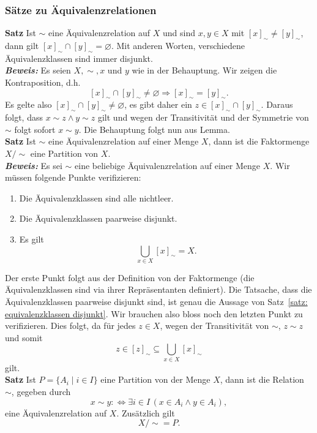 \subsubsection{Sätze zu Äquivalenzrelationen}%
\label{ssub:sätze_zu_äquivalenzrelationen}
\textbf{Satz }
  Ist $\sim $ eine Äquivalenzrelation auf $X$ und sind $x,y\in X$ mit $[x]_\sim\neq[y]_\sim$, dann gilt $[x]_\sim\cap[y]_\sim=\varnothing$.
    Mit anderen Worten, verschiedene Äquivalenzklassen sind immer disjunkt.\\
\textbf{\textit{Beweis: }} 
Es seien $X,\sim,x$ und $y$ wie in der Behauptung. Wir zeigen die Kontraposition, d.h.
    \[
    [x]_\sim\cap[y]_\sim\neq\varnothing\Rightarrow [x]_\sim=[y]_\sim.
    \]
    Es gelte also $[x]_\sim\cap[y]_\sim\neq\varnothing$, es gibt daher ein $z\in [x]_\sim\cap[y]_\sim$. Daraus folgt,
    dass $x\sim z\land y\sim z$ gilt und wegen der Transitivität und der Symmetrie von $\sim$ folgt sofort $x\sim y$.
    Die Behauptung folgt nun aus Lemma.\\
\textbf{Satz }
Ist $\sim$ eine Äquivalenzrelation auf einer Menge $X$, dann ist die Faktormenge $X/\sim$ eine Partition von $X$.\\ 
\textbf{\textit{Beweis: }} 
Es sei $\sim$ eine beliebige Äquivalenzrelation auf einer Menge $X$. Wir müssen folgende Punkte verifizieren:
    \begin{enumerate}
    \item\label{a} Die Äquivalenzklassen sind alle nichtleer.
    \item\label{2} Die Äquivalenzklassen paarweise disjunkt.
    \item\label{3} Es gilt
    \[
    \bigcup_{x\in X}[x]_{\sim}=X.
    \]
    \end{enumerate}
    Der erste Punkt folgt aus der Definition von der Faktormenge (die Äquivalenzklassen sind via ihrer Repräsentanten definiert). Die Tatsache, dass die Äquivalenzklassen paarweise disjunkt sind, ist genau die Aussage von Satz~\ref{satz: equivalenzklassen disjunkt}. Wir brauchen also bloss noch den letzten Punkt zu verifizieren. Dies folgt, da für jedes $z\in X$, wegen der Transitivität von $\sim$, $z\sim z$ und somit
    \[
    z\in[z]_\sim\subseteq\bigcup_{x\in X}[x]_\sim
    \]
    gilt.\\
\textbf{Satz }
    Ist $P=\{A_i\mid i\in I\}$ eine Partition von der Menge $X$, dann ist die Relation $\sim$, gegeben durch
    \[
    x\sim y:\Leftrightarrow \exists i\in I\,(x\in A_i\land y\in A_i),
    \]
    eine Äquivalenzrelation auf $X$. Zusätzlich gilt
    \[
    X/\sim=P.
    \]\\
